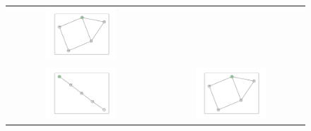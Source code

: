 \documentclass[12pt, a4paper]{extarticle}
\begin{document}
\begin{figure}
\begin{tabularx}{\textwidth}{cc}
\includegraphics[width=0.5\textwidth]{task11-graphlets/5_16-18-25-23-24.pdf} \\
\includegraphics[width=0.5\textwidth]{task11-graphlets/5_5-10-16-25-23.pdf} &
\includegraphics[width=0.5\textwidth]{task11-graphlets/5_16-21-18-25-23.pdf} \\
\end{tabularx}\end{figure}
\end{document}
